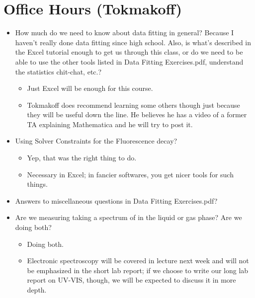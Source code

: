\documentclass[../notes.tex]{subfiles}
\begin{document}
\section{Office Hours (Tokmakoff)}
\begin{itemize}
    \item How much do we need to know about data fitting in general? Because I haven't really done data fitting since high school. Also, is what's described in the Excel tutorial enough to get us through this class, or do we need to be able to use the other tools listed in Data Fitting Exercises.pdf, understand the statistics chit-chat, etc.?
    \begin{itemize}
        \item Just Excel will be enough for this course.
        \item Tokmakoff does recommend learning some others though just because they will be useful down the line. He believes he has a video of a former TA explaining Mathematica and he will try to post it.
    \end{itemize}
    \item Using Solver Constraints for the Fluorescence decay?
    \begin{itemize}
        \item Yep, that was the right thing to do.
        \item Necessary in Excel; in fancier softwares, you get nicer tools for such things.
    \end{itemize}
    \item Answers to miscellaneous questions in Data Fitting Exercises.pdf?
    \item Are we measuring taking a spectrum of  in the liquid or gas phase? Are we doing both?
    \begin{itemize}
        \item Doing both.
        \item Electronic spectroscopy will be covered in lecture next week and will not be emphasized in the short lab report; if we choose to write our long lab report on UV-VIS, though, we will be expected to discuss it in more depth. 
    \end{itemize}
\end{itemize}
\end{document}
